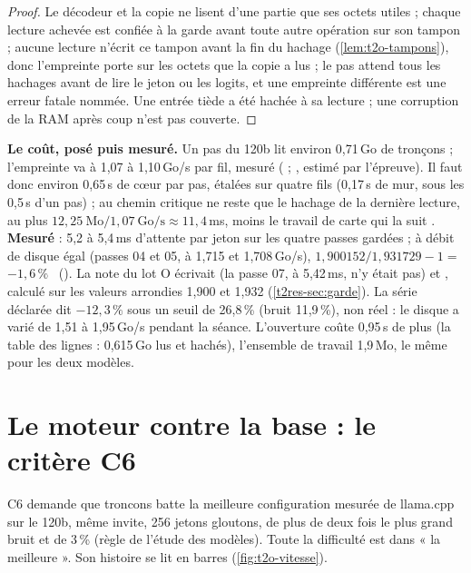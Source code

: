 \begin{proof}
Le décodeur et la copie ne lisent d'une partie que ses octets utiles ; chaque lecture achevée est confiée à la garde avant toute autre opération sur son tampon ; aucune lecture n'écrit ce tampon avant la fin du hachage (\cref{lem:t2o-tampons}), donc l'empreinte porte sur les octets que la copie a lus ; le pas attend tous les hachages avant de lire le jeton ou les logits, et une empreinte différente est une erreur fatale nommée. Une entrée tiède a été hachée à sa lecture ; une corruption de la RAM après coup n'est pas couverte.
\end{proof}

\textbf{Le coût, posé puis mesuré.} Un pas du 120b lit environ 0,71\,Go de tronçons ; l'empreinte va à 1,07 à 1,10\,Go/s par fil, mesuré ( ; , estimé par l'épreuve). Il faut donc environ 0,65\,s de cœur par pas, étalées sur quatre fils (0,17\,s de mur, sous les 0,5\,s d'un pas) ; au chemin critique ne reste que le hachage de la dernière lecture, au plus $12{,}25~\text{Mo}/1{,}07~\text{Go/s} \approx 11{,}4$\,ms, moins le travail de carte qui la suit \calc. \textbf{Mesuré} : 5,2 à 5,4\,ms d'attente par jeton sur les quatre passes gardées ; à débit de disque égal (passes 04 et 05, à 1,715 et 1,708\,Go/s), $1{,}900152 / 1{,}931729 - 1 = $ \textbf{$-1{,}6\,\%$} \mes~(). La note du lot O écrivait  (la passe 07, à 5,42\,ms, n'y était pas) et , calculé sur les valeurs arrondies 1,900 et 1,932 (\cref{t2res-sec:garde}). La série déclarée dit $-12{,}3\,\%$ sous un seuil de 26,8\,\% (bruit 11,9\,\%), non réel : le disque a varié de 1,51 à 1,95\,Go/s pendant la séance. L'ouverture coûte 0,95\,s de plus (la table des lignes : 0,615\,Go lus et hachés), l'ensemble de travail 1,9\,Mo, le même pour les deux modèles.

\section{Le moteur contre la base : le critère C6}\label{sec:t2o-c6}

C6 demande que troncons batte la meilleure configuration mesurée de llama.cpp sur le 120b, même invite, 256 jetons gloutons, de plus de deux fois le plus grand bruit et de 3\,\% (règle de l'étude des modèles). Toute la difficulté est dans « la meilleure ». Son histoire se lit en barres (\cref{fig:t2o-vitesse}).

